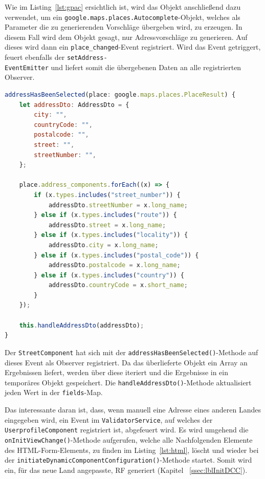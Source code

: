 Wie im Listing~\ref{lst:gpac} ersichtlich ist, wird das Objekt anschließend dazu verwendet, um ein \texttt{google.maps.places.Autocomplete}-Objekt, welches als Parameter die zu generierenden Vorschläge übergeben wird, zu erzeugen. In diesem Fall wird dem Objekt gesagt, nur Adressvorschläge zu generieren. Auf dieses wird dann ein \texttt{place\_changed}-Event registriert. Wird das Event getriggert, feuert ebenfalls der \texttt{setAddress-\\EventEmitter} und liefert somit die übergebenen Daten an alle registrierten Observer.

\begin{lstlisting}[caption={Die \texttt{addressHasBeenSelected()}-Methode der \texttt{StreetComponent}-Klasse}, language=JavaScript,label={lst:gpac}]
addressHasBeenSelected(place: google.maps.places.PlaceResult) {
	let addressDto: AddressDto = {
		city: "",
		countryCode: "",
		postalcode: "",
		street: "",
		streetNumber: "",
	};
	
	place.address_components.forEach((x) => {
		if (x.types.includes("street_number")) {
			addressDto.streetNumber = x.long_name;
		} else if (x.types.includes("route")) {
			addressDto.street = x.long_name;
		} else if (x.types.includes("locality")) {
			addressDto.city = x.long_name;
		} else if (x.types.includes("postal_code")) {
			addressDto.postalcode = x.long_name;
		} else if (x.types.includes("country")) {
			addressDto.countryCode = x.short_name;
		}
	});
	
	this.handleAddressDto(addressDto);
}
\end{lstlisting}

Der \texttt{StreetComponent} hat sich mit der \texttt{addressHasBeenSelected()}-Methode auf dieses Event als Observer registriert. Da das überlieferte Objekt ein Array an Ergebnissen liefert, werden über diese iteriert und die Ergebnisse in ein temporäres Objekt gespeichert. Die \texttt{handleAddressDto()}-Methode aktualisiert jeden Wert in der \texttt{fields}-Map. 

Das interessante daran ist, dass, wenn manuell eine Adresse eines anderen Landes eingegeben wird, ein Event im \texttt{ValidatorService}, auf welches der \texttt{UserprofileComponent} registriert ist, abgefeuert wird. Es wird umgehend die \texttt{onInitViewChange()}-Methode aufgerufen, welche alle Nachfolgenden Elemente des HTML-Form-Elements, zu finden im Listing~\ref{lst:html}, löscht und wieder bei der \texttt{initiateDynamicComponentConfiguration()}-Methode startet. Somit wird ein, für das neue Land angepasste, RF generiert (Kapitel ~\ref{ssec:lblInitDCC}).


